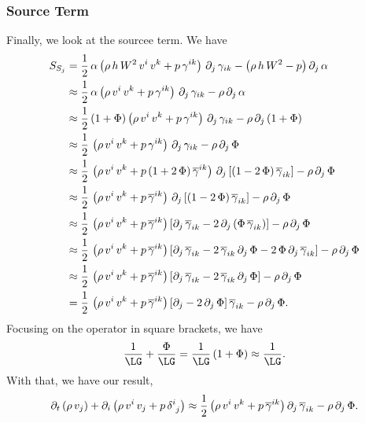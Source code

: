 \subsubsection{Source Term}
Finally, we look at the sourcee term.
We have
\begin{align}
  S_{S_{j}}
  &=\frac{1}{2}\,\alpha
  \left(\rho\,h\,W^{2}\,v^{i}\,v^{k}+p\,\gamma^{ik}\right)\,
  \partial_{j}\,\gamma_{ik}-\left(\rho\,h\,W^{2}-p\right)\partial_{j}\,\alpha \\
  &\approx\frac{1}{2}\,\alpha
  \left(\rho\,v^{i}\,v^{k}+p\,\gamma^{ik}\right)\,
  \partial_{j}\,\gamma_{ik}-\rho\,\partial_{j}\,\alpha \\
  &\approx\frac{1}{2}\left(1+\Phi\right)
  \left(\rho\,v^{i}\,v^{k}+p\,\gamma^{ik}\right)\,
  \partial_{j}\,\gamma_{ik}-\rho\,\partial_{j}\left(1+\Phi\right) \\
  &\approx\frac{1}{2}\,
  \left(\rho\,v^{i}\,v^{k}+p\,\gamma^{ik}\right)\,
  \partial_{j}\,\gamma_{ik}-\rho\,\partial_{j}\,\Phi \\
  &\approx\frac{1}{2}\,
  \left(\rho\,v^{i}\,v^{k}
  +p\left(1+2\,\Phi\right)\overline{\gamma}^{ik}\right)\,
  \partial_{j}\left[\left(1-2\,\Phi\right)\overline{\gamma}_{ik}\right]
  -\rho\,\partial_{j}\,\Phi \\
  &\approx\frac{1}{2}\,
  \left(\rho\,v^{i}\,v^{k}
  +p\,\overline{\gamma}^{ik}\right)\,
  \partial_{j}\left[\left(1-2\,\Phi\right)\overline{\gamma}_{ik}\right]
  -\rho\,\partial_{j}\,\Phi \\
  &\approx\frac{1}{2}\,
  \left(\rho\,v^{i}\,v^{k}
  +p\,\overline{\gamma}^{ik}\right)
  \left[\partial_{j}\,\overline{\gamma}_{ik}
  -2\,\partial_{j}\left(\Phi\,\overline{\gamma}_{ik}\right)\right]
  -\rho\,\partial_{j}\,\Phi \\
  &\approx\frac{1}{2}\,
  \left(\rho\,v^{i}\,v^{k}
  +p\,\overline{\gamma}^{ik}\right)
  \left[\partial_{j}\,\overline{\gamma}_{ik}
  -2\,\overline{\gamma}_{ik}\,\partial_{j}\,\Phi
  -2\,\Phi\,\partial_{j}\,\overline{\gamma}_{ik}\right]
  -\rho\,\partial_{j}\,\Phi \\
  &\approx\frac{1}{2}\,
  \left(\rho\,v^{i}\,v^{k}
  +p\,\overline{\gamma}^{ik}\right)
  \left[\partial_{j}\,\overline{\gamma}_{ik}
  -2\,\overline{\gamma}_{ik}\,\partial_{j}\,\Phi\right]
  -\rho\,\partial_{j}\,\Phi \\
  &=\frac{1}{2}\,
  \left(\rho\,v^{i}\,v^{k}
  +p\,\overline{\gamma}^{ik}\right)
  \left[\partial_{j}-2\,\partial_{j}\,\Phi\right]\overline{\gamma}_{ik}
  -\rho\,\partial_{j}\,\Phi.
\end{align}
Focusing on the operator in square brackets, we have
\begin{equation}
  \frac{1}{\LG}+\frac{\Phi}{\LG}
  =\frac{1}{\LG}\left(1+\Phi\right)
  \approx\frac{1}{\LG}.
\end{equation}
With that, we have our result,
\begin{equation}
  \partial_{t}\left(\rho\,v_{j}\right)
  +\partial_{i}\left(\rho\,v^{i}\,v_{j}+p\,\delta^{i}_{~j}\right)
  \approx\frac{1}{2}\left(\rho\,v^{i}\,v^{k}+p\,\overline{\gamma}^{ik}\right)
  \partial_{j}\,\overline{\gamma}_{ik}-\rho\,\partial_{j}\,\Phi.
\end{equation}

